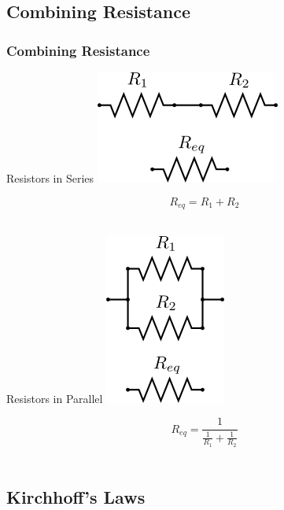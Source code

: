 \documentclass[fleqn]{beamer} %
\newcommand{\sectionIIsubsectionIItitle}{Combining Resistance}
\newcommand{\sectionIIsubsectionIIItitle}{Kirchhoff's Laws}
\begin{document}
		\subsection{\sectionIIsubsectionIItitle}\label{sectionIIsubsectionII}

			\begin{frame}
				\frametitle{\sectionIIsubsectionIItitle}

				\begin{multicols}{2}

					\begin{center}
					Resistors in Series\vspcc
					\includegraphics[scale=.2]{images/series_resistors.png} 
					\end{center}
					\[R_{eq}=R_1+R_2 \]
					\vspace{15mm}\\

					\begin{center}
					Resistors in Parallel \vspcc
					\includegraphics[scale=.2]{images/parallel_resistors.png}
					\end{center}
					\[R_{eq}=\frac{1}{\frac{1}{R_1}+\frac{1}{R_2}} \]
					\vspace{10mm}\\

				\end{multicols}

			\end{frame}

		\subsection{\sectionIIsubsectionIIItitle}\label{sectionIIsubsectionIII}
\end{document}
